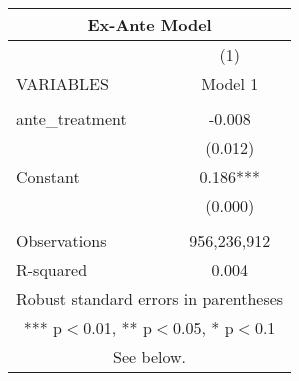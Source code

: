 \begin{tabular}{lc}
\multicolumn{2}{c}{Ex-Ante Model} \\ \hline
 & (1) \\
VARIABLES & Model 1 \\ \hline
 &  \\
ante\_treatment & -0.008 \\
 & (0.012) \\
Constant & 0.186*** \\
 & (0.000) \\
 &  \\
Observations & 956,236,912 \\
 R-squared & 0.004 \\ \hline
\multicolumn{2}{c}{ Robust standard errors in parentheses} \\
\multicolumn{2}{c}{ *** p$<$0.01, ** p$<$0.05, * p$<$0.1} \\
\multicolumn{2}{c}{ See below.} \\
\end{tabular}
